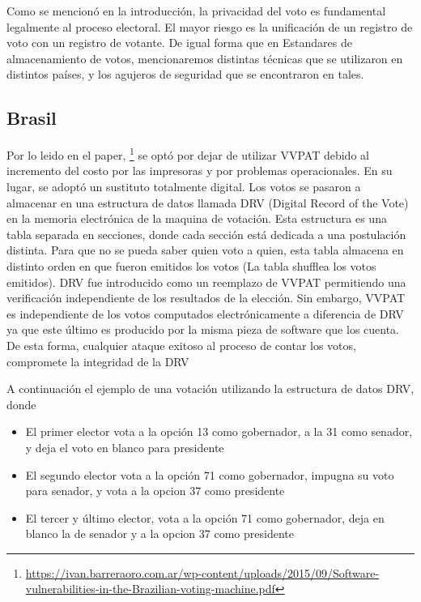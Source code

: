 Como se mencionó en la introducción, la privacidad del voto es fundamental legalmente al proceso electoral. El mayor riesgo es la unificación de un registro de voto con un registro de votante. 
De igual forma que en Estandares de almacenamiento de votos, mencionaremos distintas técnicas que se utilizaron en distintos países, y los agujeros de seguridad que se encontraron en tales.

\subsection{Brasil}
Por lo leido en el paper, 
\footnote{\url{https://ivan.barreraoro.com.ar/wp-content/uploads/2015/09/Software-vulnerabilities-in-the-Brazilian-voting-machine.pdf}}
se optó por dejar de utilizar VVPAT debido al incremento del costo por las impresoras y por problemas operacionales. En su lugar,  se adoptó un sustituto totalmente digital. Los votos se pasaron a almacenar en una estructura de datos llamada DRV (Digital Record of the Vote) en la memoria electrónica de la maquina de votación.  Esta estructura es una tabla separada en secciones, donde cada sección está dedicada a una postulación distinta. Para que no se pueda saber quien voto a quien, esta tabla almacena en distinto orden en que fueron emitidos los votos (La tabla shufflea los votos emitidos). 
DRV fue introducido como un reemplazo de VVPAT permitiendo una verificación independiente de los resultados de la elección.  Sin embargo, VVPAT es independiente de los votos computados electrónicamente a diferencia de DRV ya que este último es producido por la misma pieza de software que los cuenta. De esta forma, cualquier ataque exitoso al proceso de contar los votos, compromete la integridad de la DRV

A continuación el ejemplo de una votación utilizando la estructura de datos DRV, donde
\begin{itemize}
	\item El primer elector vota a la opción 13 como gobernador, a la 31 como senador, y deja el voto en blanco para presidente
	\item El segundo elector vota a la opción 71 como gobernador, impugna su voto para senador, y vota a la opcion 37 como presidente
	\item El tercer y último elector, vota a la opción 71 como gobernador, deja en blanco la de senador y a la opcion 37 como presidente
\end{itemize}

